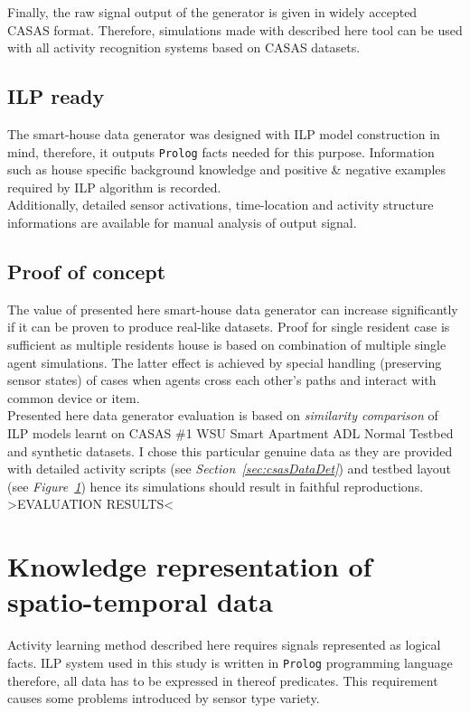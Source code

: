 \documentclass[11pt, a4paper, pdflatex, leqno, twoside, openright]{report}
\begin{document}
Finally, the raw signal output of the generator is given in widely accepted CASAS format. Therefore, simulations made with described here tool can be used with all activity recognition systems based on CASAS datasets.

    \subsection{ILP ready}
The smart-house data generator was designed with ILP model construction in mind, therefore, it outputs \texttt{Prolog} facts needed for this purpose. Information such as house specific background knowledge and positive \& negative examples required by ILP algorithm is recorded.\\
Additionally, detailed sensor activations, time-location and activity structure informations are available for manual analysis of output signal.

    \subsection{Proof of concept}
The value of presented here smart-house data generator can increase significantly if it can be proven to produce real-like datasets. Proof for single resident case is sufficient as multiple residents house is based on combination of multiple single agent simulations. The latter effect is achieved by special handling (preserving sensor states) of cases when agents cross each other's paths and interact with common device or item.\\

Presented here data generator evaluation is based on \emph{similarity comparison} of ILP models learnt on CASAS \#1 WSU Smart Apartment ADL Normal Testbed and synthetic datasets. I chose this particular genuine data as they are provided with detailed activity scripts (see \emph{Section~\ref{sec:csasDataDet}}) and testbed layout (see \emph{Figure~\ref{}}) hence its simulations should result in faithful reproductions.\\

>EVALUATION RESULTS<

  \section{Knowledge representation of spatio-temporal data}
Activity learning method described here requires signals represented as logical facts. ILP system used in this study is written in \texttt{Prolog} programming language therefore, all data has to be expressed in thereof predicates. This requirement causes some problems introduced by sensor type variety.\\
\end{document}
